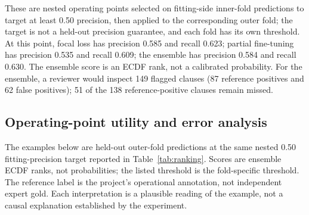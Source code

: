 \documentclass[12pt,a4paper,oneside]{report}
\begin{document}
These are nested operating points selected on fitting-side inner-fold predictions to target at least 0.50 precision, then applied to the corresponding outer fold; the target is not a held-out precision guarantee, and each fold has its own threshold. At this point, focal loss has precision 0.585 and recall 0.623; partial fine-tuning has precision 0.535 and recall 0.609; the ensemble has precision 0.584 and recall 0.630. The ensemble score is an ECDF rank, not a calibrated probability. For the ensemble, a reviewer would inspect 149 flagged clauses (87 reference positives and 62 false positives); 51 of the 138 reference-positive clauses remain missed.

\subsection{Operating-point utility and error analysis}

The examples below are held-out outer-fold predictions at the same nested 0.50 fitting-precision target reported in Table~\ref{tab:ranking}. Scores are ensemble ECDF ranks, not probabilities; the listed threshold is the fold-specific threshold. The reference label is the project's operational annotation, not independent expert gold. Each interpretation is a plausible reading of the example, not a causal explanation established by the experiment.
\end{document}
